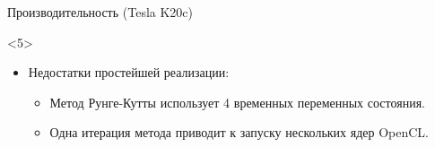 \documentclass[@BEAMER_OPTIONS@]{beamer}
\begin{document}
\begin{frame}[fragile]{Производительность (Tesla K20c)}
\begin{figure}
    \end{figure}
    \begin{uncoverenv}<5>
        \begin{itemize}
            \item Недостатки простейшей реализации:
                \begin{itemize}
                    \item Метод Рунге-Кутты использует 4 временных переменных
                        состояния.
                    \item Одна итерация метода приводит к запуску нескольких
                        ядер OpenCL.
                \end{itemize}
            \end{itemize}
    \end{uncoverenv}
\end{frame}

\note{ }
\end{document}
